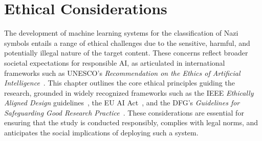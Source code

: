 
\chapter{Ethical Considerations}\label{chapter:ethical-considerations}

The development of machine learning systems for the classification of Nazi symbols entails a range of ethical
challenges due to the sensitive, harmful, and potentially illegal nature of the target content. These concerns
reflect broader societal expectations for responsible AI, as articulated in international frameworks such as \ac{UNESCO}’s
\textit{Recommendation on the Ethics of Artificial Intelligence}~\parencite{unesco2021}. This chapter
outlines the core ethical principles guiding the research, grounded in widely recognized frameworks such as the \ac{IEEE}
\textit{Ethically Aligned Design} guidelines~\parencite{ieee2021ethics}, the EU AI Act~\parencite{euai2023}, and the
\ac{DFG}’s \textit{Guidelines for Safeguarding Good Research Practice}~\parencite{dfg2022}. These considerations are
essential for ensuring that the study is conducted responsibly, complies with legal norms, and anticipates the
social implications of deploying such a system.

